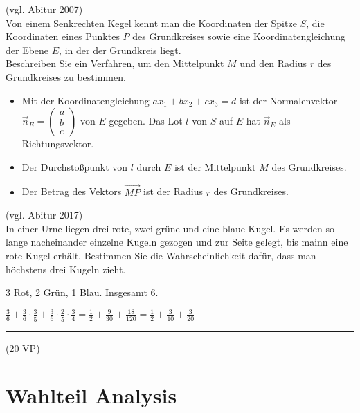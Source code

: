  (vgl. Abitur 2007)\\
Von einem Senkrechten Kegel kennt man die Koordinaten der Spitze $S$, die Koordinaten eines Punktes $P$ des Grundkreises sowie eine Koordinatengleichung der Ebene $E$, in der der Grundkreis liegt.
\\Beschreiben Sie ein Verfahren, um den Mittelpunkt $M$ und den Radius $r$ des Grundkreises zu bestimmen.

\begin{lsg}{}
\begin{itemize}
  \item Mit der Koordinatengleichung $ax_1+bx_2+cx_3=d$ ist der Normalenvektor $\vec n_E=\left(\begin{array}{c}a\\b\\c\end{array}\right)$ von $E$ gegeben.
  Das Lot $l$ von $S$ auf $E$ hat $\vec n_E$ als Richtungsvektor.
  \item Der Durchstoßpunkt von $l$ durch $E$ ist der Mittelpunkt $M$ des Grundkreises.
  \item Der Betrag des Vektors $\overrightarrow{MP}$ ist der Radius $r$ des Grundkreises.
\end{itemize}
\end{lsg}

 (vgl. Abitur 2017)\\
In einer Urne liegen drei rote, zwei grüne und eine blaue Kugel. Es werden so lange nacheinander einzelne Kugeln gezogen und zur Seite gelegt, bis mainn eine rote Kugel erhält. Bestimmen Sie die Wahrscheinlichkeit dafür, dass man höchstens drei Kugeln zieht. 
\begin{lsg}{}
3 Rot, 2 Grün, 1 Blau. Insgesamt 6.

$\frac 3 6 + \frac 3 6 \cdot\frac 3 5 + \frac 3 6 \cdot \frac 2 5 \cdot \frac 3 4 = \frac 1 2+\frac{9}{30} +\frac{18}{120}=\frac 1 2 + \frac{3}{10}+  \frac{3}{20}$
\end{lsg}

\vfill

\hfill\rule{1.5cm}{0.4mm}

\hfill (20 VP)\hspace{0.22cm}

\section{Wahlteil Analysis}

